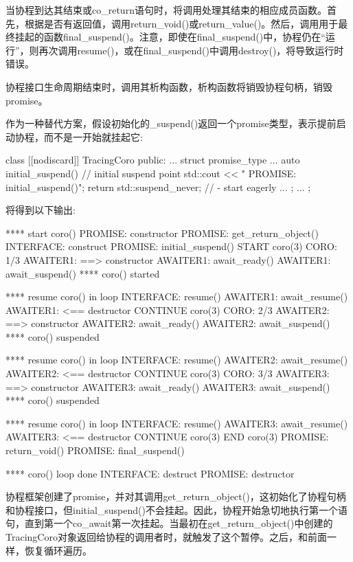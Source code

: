 当协程到达其结束或co\_return语句时，将调用处理其结束的相应成员函数。首先，根据是否有返回值，调用return\_void()或return\_value()。然后，调用用于最终挂起的函数final\_suspend()。注意，即使在final\_suspend()中，协程仍在“运行”，则再次调用resume()，或在final\_suspend()中调用destroy()，将导致运行时错误。

协程接口生命周期结束时，调用其析构函数，析构函数将销毁协程句柄，销毁promise。

作为一种替代方案，假设初始化的\_suspend()返回一个promise类型，表示提前启动协程，而不是一开始就挂起它:

\begin{cpp}
class [[nodiscard]] TracingCoro {
	public:
	...
	struct promise_type {
		...
		auto initial_suspend() { // initial suspend point
			std::cout << " PROMISE: initial_suspend()\n";
			return std::suspend_never{}; // - start eagerly
		}
		...
	};
	...
};
\end{cpp}

将得到以下输出:

\begin{shell}
**** start coro()
      PROMISE: constructor
      PROMISE: get_return_object()
        INTERFACE: construct
      PROMISE: initial_suspend()
  START coro(3)
  CORO: 1/3
          AWAITER1: ==> constructor
          AWAITER1: await_ready()
          AWAITER1: await_suspend()
**** coro() started

**** resume coro() in loop
        INTERFACE: resume()
          AWAITER1: await_resume()
          AWAITER1: <== destructor
  CONTINUE coro(3)
  CORO: 2/3
          AWAITER2: ==> constructor
          AWAITER2: await_ready()
          AWAITER2: await_suspend()
**** coro() suspended

**** resume coro() in loop
        INTERFACE: resume()
          AWAITER2: await_resume()
          AWAITER2: <== destructor
  CONTINUE coro(3)
  CORO: 3/3
          AWAITER3: ==> constructor
          AWAITER3: await_ready()
          AWAITER3: await_suspend()
**** coro() suspended

**** resume coro() in loop
        INTERFACE: resume()
          AWAITER3: await_resume()
          AWAITER3: <== destructor
  CONTINUE coro(3)
  END coro(3)
      PROMISE: return_void()
      PROMISE: final_suspend()

**** coro() loop done
        INTERFACE: destruct
      PROMISE: destructor
\end{shell}

协程框架创建了promise，并对其调用get\_return\_object()，这初始化了协程句柄和协程接口，但initial\_suspend()不会挂起。因此，协程开始急切地执行第一个语句，直到第一个co\_await第一次挂起。当最初在get\_return\_object()中创建的TracingCoro对象返回给协程的调用者时，就触发了这个暂停。之后，和前面一样，恢复循环遍历。










